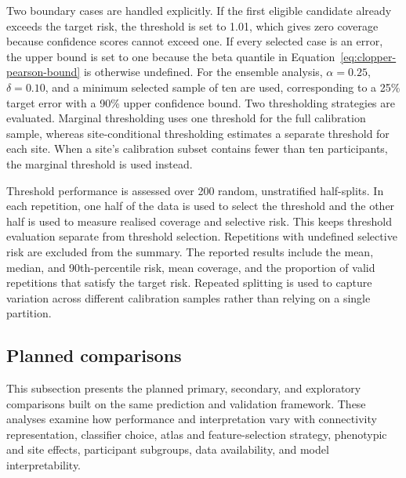 
Two boundary cases are handled explicitly. If the first eligible candidate already
exceeds the target risk, the threshold is set to 1.01, which gives zero coverage because
confidence scores cannot exceed one. If every selected case is an error, the upper bound
is set to one because the beta quantile in Equation~\eqref{eq:clopper-pearson-bound} is otherwise undefined.
For the ensemble analysis, $\alpha=0.25$, $\delta=0.10$, and a minimum selected sample of
ten are used, corresponding to a 25\% target error with a 90\% upper confidence bound.
Two thresholding strategies are evaluated. Marginal thresholding uses one threshold for
the full calibration sample, whereas site-conditional thresholding estimates a separate
threshold for each site. When a site's calibration subset contains fewer than ten
participants, the marginal threshold is used instead.

Threshold performance is assessed over 200 random, unstratified half-splits. In each
repetition, one half of the data is used to select the threshold and the other half is used
to measure realised coverage and selective risk. This keeps threshold evaluation separate
from threshold selection. Repetitions with undefined selective risk are excluded from the
summary. The reported results include the mean, median, and 90th-percentile risk, mean
coverage, and the proportion of valid repetitions that satisfy the target risk. Repeated
splitting is used to capture variation across different calibration samples rather than
relying on a single partition.



\subsection{Planned comparisons}
\label{subsec:planned-comparisons}
This subsection presents the planned primary, secondary, and exploratory comparisons built on the same prediction and validation framework. These analyses examine how performance and interpretation vary with connectivity representation, classifier choice, atlas and feature-selection strategy, phenotypic and site effects, participant subgroups, data availability, and model interpretability. 

